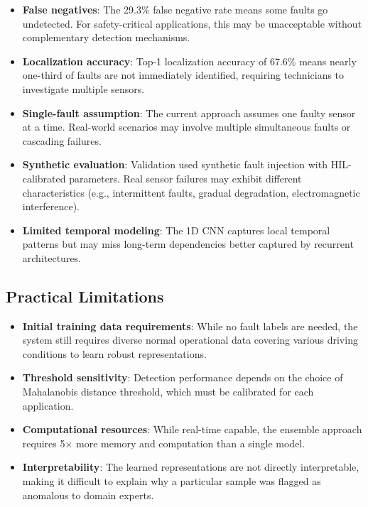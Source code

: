 \begin{itemize}
    \item \textbf{False negatives}: The 29.3\% false negative rate means some faults go undetected. For safety-critical applications, this may be unacceptable without complementary detection mechanisms.

    \item \textbf{Localization accuracy}: Top-1 localization accuracy of 67.6\% means nearly one-third of faults are not immediately identified, requiring technicians to investigate multiple sensors.

    \item \textbf{Single-fault assumption}: The current approach assumes one faulty sensor at a time. Real-world scenarios may involve multiple simultaneous faults or cascading failures.

    \item \textbf{Synthetic evaluation}: Validation used synthetic fault injection with HIL-calibrated parameters. Real sensor failures may exhibit different characteristics (e.g., intermittent faults, gradual degradation, electromagnetic interference).

    \item \textbf{Limited temporal modeling}: The 1D CNN captures local temporal patterns but may miss long-term dependencies better captured by recurrent architectures.
\end{itemize}

\subsection{Practical Limitations}

\begin{itemize}
    \item \textbf{Initial training data requirements}: While no fault labels are needed, the system still requires diverse normal operational data covering various driving conditions to learn robust representations.

    \item \textbf{Threshold sensitivity}: Detection performance depends on the choice of Mahalanobis distance threshold, which must be calibrated for each application.

    \item \textbf{Computational resources}: While real-time capable, the ensemble approach requires 5× more memory and computation than a single model.

    \item \textbf{Interpretability}: The learned representations are not directly interpretable, making it difficult to explain why a particular sample was flagged as anomalous to domain experts.
\end{itemize}

